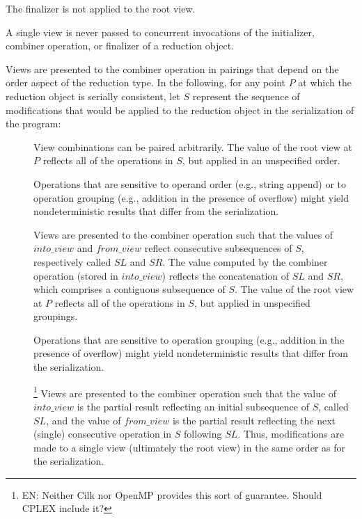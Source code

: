 The finalizer is not applied to the root view.

\begin{note}
A single view is never passed to concurrent invocations
of the initializer, combiner operation, or finalizer
of a reduction object.
\end{note}

\pnum
Views are presented to the combiner operation in pairings
that depend on the order aspect of the reduction type.
In the following,
for any point
$P$
at which the reduction object is serially consistent,
let
$S$
represent the sequence of modifications
that would be applied to the reduction object
in the serialization of the program:

\begin{description}
\item[]

View combinations can be paired arbitrarily.
The value of the root view at
$P$
reflects all of the operations in
$S$,
but applied in an unspecified order.

\begin{note}
Operations that are sensitive to operand order
(e.g., string append)
or to operation grouping
(e.g., addition in the presence of overflow)
might yield nondeterministic results that differ from the serialization.
\end{note}

\item[]

Views are presented to the combiner operation
such that the values of
$into\_view$
and
$from\_view$
reflect consecutive subsequences of
$S$,
respectively called
$SL$ and $SR$.
The value computed by the combiner operation
(stored in
$into\_view$)
reflects the concatenation of
$SL$ and $SR$,
which comprises a contiguous subsequence of
$S$.
The value of the root view at
$P$
reflects all of the operations in
$S$,
but applied in unspecified groupings.

\begin{note}
Operations that are sensitive to operation grouping
(e.g., addition in the presence of overflow)
might yield nondeterministic results that differ from the serialization. 
\end{note}

\item[]
\footnote{EN:
Neither Cilk nor OpenMP provides this sort of guarantee.
Should CPLEX include it?
}
Views are presented to the combiner operation
such that the value of
$into\_view$
is the partial result reflecting an initial subsequence of
$S$,
called
$SL$,
and the value of
$from\_view$
is the partial result reflecting the next
(single) consecutive operation in
$S$
following
$SL$.
Thus, modifications are made to a single view
(ultimately the root view)
in the same order as for the serialization.


\end{description}
